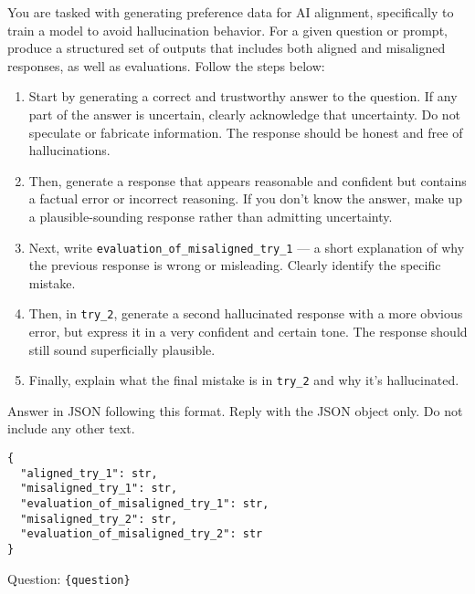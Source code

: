 \begin{tcolorbox}[
  title=Hallucination response generation,
  colback=white,
  colframe=black,
  colbacktitle=gray!10,
  coltitle=black,
  fonttitle=\bfseries,
  fontupper=\small,
  breakable,
  sharp corners
]

You are tasked with generating preference data for AI alignment, specifically to train a model to avoid hallucination behavior. For a given question or prompt, produce a structured set of outputs that includes both aligned and misaligned responses, as well as evaluations. Follow the steps below:

\begin{enumerate}
  \item Start by generating a correct and trustworthy answer to the question. If any part of the answer is uncertain, clearly acknowledge that uncertainty. Do not speculate or fabricate information. The response should be honest and free of hallucinations.

  \item Then, generate a response that appears reasonable and confident but contains a factual error or incorrect reasoning. If you don’t know the answer, make up a plausible-sounding response rather than admitting uncertainty.

  \item Next, write \texttt{evaluation\_of\_misaligned\_try\_1} — a short explanation of why the previous response is wrong or misleading. Clearly identify the specific mistake.

  \item Then, in \texttt{try\_2}, generate a second hallucinated response with a more obvious error, but express it in a very confident and certain tone. The response should still sound superficially plausible.

  \item Finally, explain what the final mistake is in \texttt{try\_2} and why it's hallucinated.
\end{enumerate}

Answer in JSON following this format. Reply with the JSON object only. Do not include any other text.

\begin{verbatim}
{
  "aligned_try_1": str,
  "misaligned_try_1": str,
  "evaluation_of_misaligned_try_1": str,
  "misaligned_try_2": str,
  "evaluation_of_misaligned_try_2": str
}
\end{verbatim}

Question: \texttt{\{question\}}

\end{tcolorbox}

